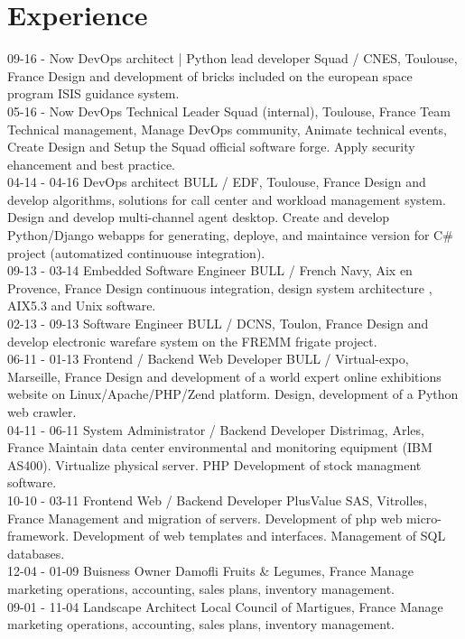 \documentclass[]{friggeri-cv}
\begin{document}
\newpage
\section{Experience}
\begin{entrylist}
    \entry
        {09-16 - Now}
        {DevOps architect | Python lead developer}
        {Squad / CNES, Toulouse, France}
        {Design and development of bricks included on the european space program ISIS guidance system.\\}
    \entry
        {05-16 - Now}
        {DevOps Technical Leader}
        {Squad (internal), Toulouse, France}
        {Team Technical management, Manage DevOps community, Animate technical events, Create Design and Setup the Squad official software forge. Apply security ehancement and best practice.\\}
    \entry
        {04-14 - 04-16}
        {DevOps architect}
        {BULL / EDF, Toulouse, France}
        {Design and develop algorithms, solutions for call center and workload management system. Design and develop multi-channel agent desktop.
        Create and develop Python/Django webapps for generating, deploye, and maintaince version for C\# project (automatized continuouse integration).\\}
    \entry
        {09-13 - 03-14}
        {Embedded Software Engineer}
        {BULL / French Navy, Aix en Provence, France}
        {Design continuous integration, design system architecture , AIX5.3 and Unix software.\\}
    \entry
        {02-13 - 09-13}
        {Software Engineer}
        {BULL / DCNS, Toulon, France}
        {Design and develop electronic warefare system on the FREMM frigate project.\\}
    \entry
        {06-11 - 01-13}
        {Frontend / Backend Web Developer}
        {BULL / Virtual-expo, Marseille, France}
        {Design and development of a world expert online exhibitions website on Linux/Apache/PHP/Zend platform. Design, development of a Python web crawler.\\}
    \entry
        {04-11 - 06-11}
        {System Administrator / Backend Developer}
        {Distrimag, Arles, France}
        {Maintain data center environmental and monitoring equipment (IBM AS400). Virtualize physical server. PHP Development of stock managment software.\\}
    \entry
        {10-10 - 03-11}
        {Frontend Web / Backend Developer}
        {PlusValue SAS, Vitrolles, France}
        {Management and migration of servers. Development of php web micro-framework. Development of web templates and interfaces. Management of SQL databases.\\}
    \entry
        {12-04 - 01-09}
        {Buisness Owner}
        {Damofli Fruits \& Legumes, France}
        {Manage marketing operations, accounting, sales plans, inventory management.\\}
    \entry
        {09-01 - 11-04}
        {Landscape Architect}
        {Local Council of Martigues, France}
        {Manage marketing operations, accounting, sales plans, inventory management.\\}
\end{entrylist}
\end{document}
